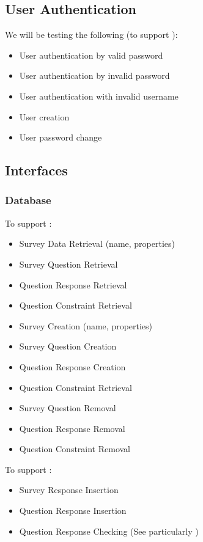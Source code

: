 \documentclass[10pt]{article}
\begin{document}
\subsection{User Authentication}

We will be testing the following (to support ):

\begin{itemize}
\item User authentication by valid password
\item User authentication by invalid password
\item User authentication with invalid username
\item User creation
\item User password change
\end{itemize}

\subsection{Interfaces}

\subsubsection{Database}

To support :

\begin{itemize}
\item Survey Data Retrieval (name, properties)
\item Survey Question Retrieval
\item Question Response Retrieval
\item Question Constraint Retrieval
\item Survey Creation (name, properties)
\item Survey Question Creation
\item Question Response Creation
\item Question Constraint Retrieval
\item Survey Question Removal
\item Question Response Removal
\item Question Constraint Removal
\end{itemize}

To support :

\begin{itemize}
\item Survey Response Insertion
\item Question Response Insertion
\item Question Response Checking (See particularly )
\end{itemize}
\end{document}
